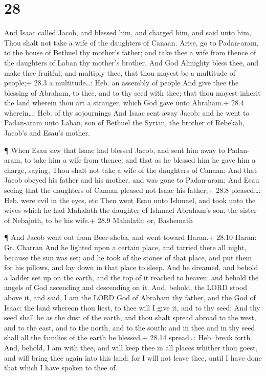 \hypertarget{section-27}{%
\section{28}\label{section-27}}

 And Isaac called Jacob, and blessed him, and charged him,
and said unto him, Thou shalt not take a wife of the daughters of
Canaan.  Arise, go to Padan-aram, to the house of Bethuel
thy mother's father; and take thee a wife from thence of the daughters
of Laban thy mother's brother.  And God Almighty bless thee,
and make thee fruitful, and multiply thee, that thou mayest be a
multitude of people;+ 28.3 a multitude\ldots: Heb. an assembly of people
 And give thee the blessing of Abraham, to thee, and to thy
seed with thee; that thou mayest inherit the land wherein thou art a
stranger, which God gave unto Abraham.+ 28.4 wherein\ldots: Heb. of thy
sojournings  And Isaac sent away Jacob: and he went to
Padan-aram unto Laban, son of Bethuel the Syrian, the brother of
Rebekah, Jacob's and Esau's mother.

 ¶ When Esau saw that Isaac had blessed Jacob, and sent him
away to Padan-aram, to take him a wife from thence; and that as he
blessed him he gave him a charge, saying, Thou shalt not take a wife of
the daughters of Canaan;  And that Jacob obeyed his father
and his mother, and was gone to Padan-aram;  And Esau seeing
that the daughters of Canaan pleased not Isaac his father;+ 28.8
pleased\ldots: Heb. were evil in the eyes, etc  Then went
Esau unto Ishmael, and took unto the wives which he had Mahalath the
daughter of Ishmael Abraham's son, the sister of Nebajoth, to be his
wife.+ 28.9 Mahalath: or, Bashemath

 ¶ And Jacob went out from Beer-sheba, and went toward
Haran.+ 28.10 Haran: Gr. Charran  And he lighted upon a
certain place, and tarried there all night, because the sun was set; and
he took of the stones of that place, and put them for his pillows, and
lay down in that place to sleep.  And he dreamed, and
behold a ladder set up on the earth, and the top of it reached to
heaven: and behold the angels of God ascending and descending on it.
 And, behold, the LORD stood above it, and said, I am the
LORD God of Abraham thy father, and the God of Isaac: the land whereon
thou liest, to thee will I give it, and to thy seed;  And
thy seed shall be as the dust of the earth, and thou shalt spread abroad
to the west, and to the east, and to the north, and to the south: and in
thee and in thy seed shall all the families of the earth be blessed.+
28.14 spread\ldots: Heb. break forth  And, behold, I am
with thee, and will keep thee in all places whither thou goest, and will
bring thee again into this land; for I will not leave thee, until I have
done that which I have spoken to thee of.

